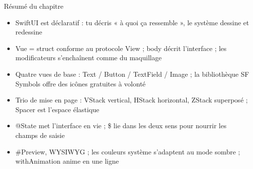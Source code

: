 \begin{tcbsummary}{Résumé du chapitre}
\begin{itemize}
  \item SwiftUI est déclaratif : tu décris « à quoi ça ressemble », le système dessine et redessine
  \item Vue = struct conforme au protocole View ; body décrit l'interface ; les modificateurs s'enchaînent comme du maquillage
  \item Quatre vues de base : Text / Button / TextField / Image ; la bibliothèque SF Symbols offre des icônes gratuites à volonté
  \item Trio de mise en page : VStack vertical, HStack horizontal, ZStack superposé ; Spacer est l'espace élastique
  \item @State met l'interface en vie ; \$ lie dans les deux sens pour nourrir les champs de saisie
  \item \#Preview, WYSIWYG ; les couleurs système s'adaptent au mode sombre ; withAnimation anime en une ligne
\end{itemize}

\end{tcbsummary}
